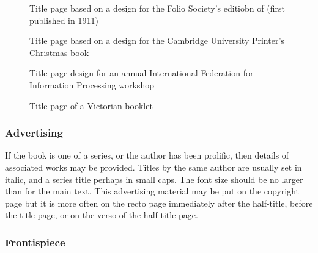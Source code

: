 \documentclass[10pt,a4paper,extrafontsizes]{memoir}
\begin{document}
\begin{figure}
\centering
\begin{showtitle}
\titleZD
\end{showtitle}
\caption{Title page based on a design for the Folio Society's editiobn of
   (first published in 1911)} \label{fig:titleZD}
\end{figure}


\begin{figure}
\centering
\begin{showtitle}
\titleWH
\end{showtitle}
\caption{Title page based on a design for the Cambridge University 
Printer's Christmas book } \label{fig:titleWH}
\end{figure}


\begin{figure}
\centering
\begin{showtitle}
\titleGP
\end{showtitle}
\caption{Title page design for an annual International Federation for 
    Information Processing workshop} \label{fig:titleGP}
\end{figure}


\begin{figure}
\centering
{\titleRB}
\caption{Title page of a Victorian booklet} \label{fig:titleRB}
\end{figure}



\subsubsection{Advertising}

\begin{paracol}{2}
\switchEng
    If the book is one of a series, or the author has been prolific, then
details of associated works may be provided. Titles by the same author
are usually set in italic, and a series title perhaps in small caps. The
font size should be no larger than for the main text. This advertising material
may be put on the copyright page but it is more often on the recto page
immediately after the half-title, before the title page, or on the verso of 
the half-title page.
\end{paracol}

\subsubsection{Frontispiece}
\end{document}
